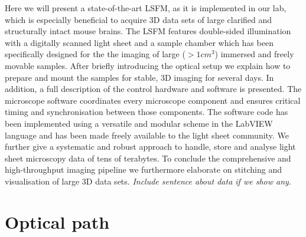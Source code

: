 \documentclass[12pt]{spieman}  %
\begin{document}
Here we will present a state-of-the-art LSFM, as it is implemented in our lab, which is especially beneficial to acquire 3D data sets of large clarified and structurally intact mouse brains. The LSFM features double-sided illumination with a digitally scanned light sheet and a sample chamber which has been specifically designed for the the imaging of large ($> 1cm^3$) immersed and freely movable samples. After briefly introducing the optical setup we explain how to prepare and mount the samples for stable, 3D imaging for several days. In addition, a full description of the control hardware and software is presented. The microscope software coordinates every microscope component and ensures critical timing and synchronisation between those components. The software code has been implemented using a versatile and modular scheme in the LabVIEW language and has been made freely available to the light sheet community. We further give a systematic and robust approach to handle, store and analyse light sheet microscopy data of tens of terabytes. To conclude the comprehensive and high-throughput imaging pipeline we furthermore elaborate on stitching and visualisation of large 3D data sets. \textit{Include sentence about data if we show any.}


\section{Optical path}
\end{document}
